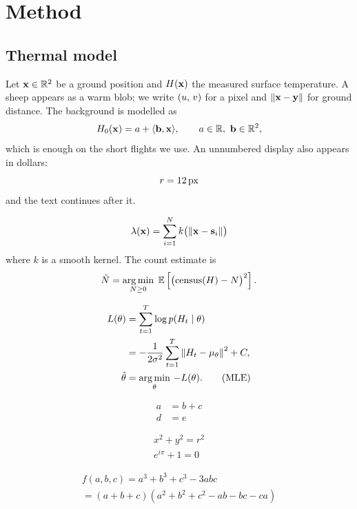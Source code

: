 \section{Method}\label{sec:method}

\subsection{Thermal model}
Let $\vec{x} \in \R^2$ be a ground position and \(\heat(\vec{x})\) the measured surface temperature. A sheep appears as a warm blob; we write $\pair{u}{v}$ for a pixel and $\norm{\vec{x} - \vec{y}}$ for ground distance. The background is modelled as
\[
  \heat_0(\vec{x}) = a + \inner{\vec{b}}{\vec{x}}, \qquad a \in \R,\ \vec{b} \in \R^2 ,
\]
which is enough on the short flights we use. An unnumbered display also appears in dollars: $$ r = \unit[px]{12} $$ and the text continues after it.

\begin{equation}
  \lambda(\vec{x}) = \sum_{i=1}^{N} k\bigl(\norm{\vec{x} - \vec{s}_i}\bigr)
  \label{eq:intensity}
\end{equation}
where $k$ is a smooth kernel. The count estimate is
\begin{equation*}
  \hat{N} = \argmin_{N \ge 0} \; \E\left[ \bigl( \census(\heat) - N \bigr)^2 \right] .
\end{equation*}

\begin{align}
  L(\theta) &= \sum_{t=1}^{T} \log p(\heat_t \mid \theta) \label{eq:lik} \\
            &= -\frac{1}{2\sigma^2} \sum_{t=1}^{T} \norm{\heat_t - \mu_\theta}^2 + C , \nonumber \\
  \hat\theta &= \argmin_\theta \, -L(\theta) . \tag{MLE}
\end{align}

\begin{align*}
  a &= b + c \\
  d &= e
\end{align*}

\begin{gather}
  x^2 + y^2 = r^2 \\
  e^{i\pi} + 1 = 0
\end{gather}

\begin{multline}
  f(a, b, c) = a^3 + b^3 + c^3 - 3abc \\
  = (a + b + c)(a^2 + b^2 + c^2 - ab - bc - ca)
\end{multline}

